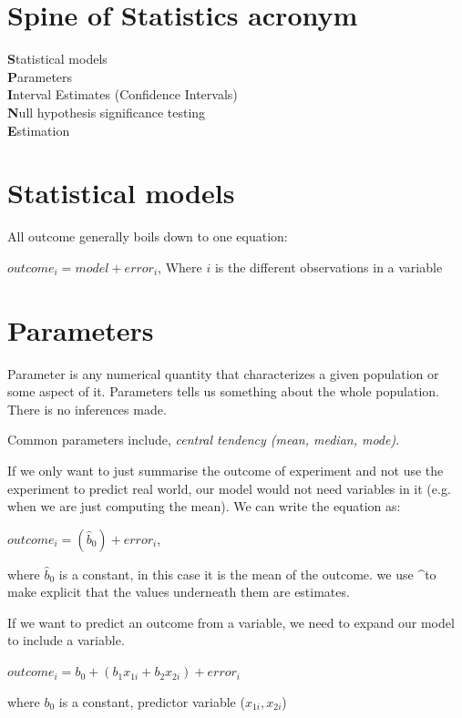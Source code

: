 
%
\section{Spine of Statistics acronym}
\textbf{S}tatistical models \\
\textbf{P}arameters \\
\textbf{I}nterval Estimates (Confidence Intervals) \\
\textbf{N}ull hypothesis significance testing \\
\textbf{E}stimation \\

\section{Statistical models}
All outcome generally boils down to one equation:
\begin{center}
$ outcome_i = model + error_i $, Where $i$ is the different observations in a variable
\end{center}

\section{Parameters}
Parameter is any numerical quantity that characterizes a given population or some aspect of it. Parameters tells us something about the whole population. There is no inferences made. 

Common parameters include, \emph{central tendency (mean, median, mode)}.

If we only want to just summarise the outcome of experiment and not use the experiment to predict real world, our model would not need variables in it (e.g. when we are just computing the mean). We can write the equation as:

\begin{center}
$ outcome_i = (\hat{b}_0) + error_i$,
\end{center}
where $\hat{b}_0$ is a constant, in this case it is the mean of the outcome. we use \textasciicircum to make explicit that the values underneath them are estimates.

If we want to predict an outcome from a variable, we need to expand our model to include a variable. 

\begin{center}
$ outcome_i = b_0 + (b_1x_{1i} + b_2x_{2i}) + error_i$
\end{center}
where $b_0$ is a constant, predictor variable ($x_{1i}, x_{2i}$)

